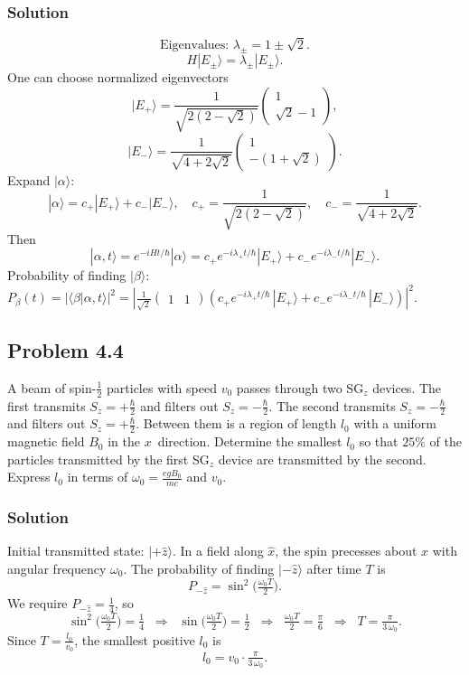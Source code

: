 \documentclass[twocolumn]{article}
\begin{document}
\begin{spacing}{1}
\subsubsection*{Solution}
\[
\text{Eigenvalues: } \lambda_{\pm} = 1 \pm \sqrt{2}.
\]
\[
H|E_{\pm}\rangle = \lambda_{\pm} |E_{\pm}\rangle.
\]
One can choose normalized eigenvectors
\[
|E_+\rangle = \frac{1}{\sqrt{2(2 - \sqrt{2})}}
\begin{pmatrix}
1 \\
\sqrt{2}-1
\end{pmatrix}, 
\]
\[
|E_-\rangle = \frac{1}{\sqrt{4 + 2\sqrt{2}}}
\begin{pmatrix}
1 \\
-(1+\sqrt{2})
\end{pmatrix}.
\]
Expand $|\alpha\rangle$:
\[
|\alpha\rangle = c_+|E_+\rangle + c_-|E_-\rangle, \quad
c_+ = \frac{1}{\sqrt{2(2 - \sqrt{2})}}, \quad
c_- = \frac{1}{\sqrt{4 + 2\sqrt{2}}}.
\]
Then
\[
|\alpha,t\rangle = e^{-iHt/\hbar}|\alpha\rangle
= c_+ e^{-i\lambda_+ t/\hbar} |E_+\rangle
+ c_- e^{-i\lambda_- t/\hbar} |E_-\rangle.
\]
Probability of finding $|\beta\rangle$:
\(
P_\beta(t) = \bigl|\langle \beta | \alpha,t \rangle \bigr|^2
= \left|\frac{1}{\sqrt{2}}
\begin{pmatrix}1 & 1\end{pmatrix}
\left(
c_+ e^{-i\lambda_+ t/\hbar}\,|E_+\rangle
+ c_- e^{-i\lambda_- t/\hbar}\,|E_-\rangle
\right)\right|^2.
\)

\subsection{Problem 4.4}
A beam of spin-$\tfrac12$ particles with speed $v_0$ passes through two SG$_z$ devices. The first transmits $S_z=+\tfrac{\hbar}{2}$ and filters out $S_z=-\tfrac{\hbar}{2}$. The second transmits $S_z=-\tfrac{\hbar}{2}$ and filters out $S_z=+\tfrac{\hbar}{2}$. Between them is a region of length $l_0$ with a uniform magnetic field $B_0$ in the $x$~direction. Determine the smallest $l_0$ so that $25\%$ of the particles transmitted by the first SG$_z$ device are transmitted by the second. Express $l_0$ in terms of $\omega_0 = \frac{e g B_0}{m c}$ and $v_0$.

\subsubsection*{Solution}
Initial transmitted state: $|+\hat{z}\rangle$. In a field along $\hat{x}$, the spin precesses about $x$ with angular frequency $\omega_0$. The probability of finding $|-\hat{z}\rangle$ after time $T$ is
\[
P_{-\hat{z}} = \sin^2\bigl(\tfrac{\omega_0 T}{2}\bigr).
\]
We require $P_{-\hat{z}} = \tfrac14$, so
\[
\sin^2\bigl(\tfrac{\omega_0 T}{2}\bigr) = \tfrac14
\;\;\Longrightarrow\;\;
\sin\bigl(\tfrac{\omega_0 T}{2}\bigr) = \tfrac12
\;\;\Longrightarrow\;\;
\tfrac{\omega_0 T}{2} = \tfrac{\pi}{6}
\;\;\Longrightarrow\;\;
T = \tfrac{\pi}{3\,\omega_0}.
\]
Since $T = \tfrac{l_0}{v_0}$, the smallest positive $l_0$ is
\[
l_0 = v_0 \cdot \tfrac{\pi}{3\,\omega_0}.
\]


\end{spacing}
\end{document}
